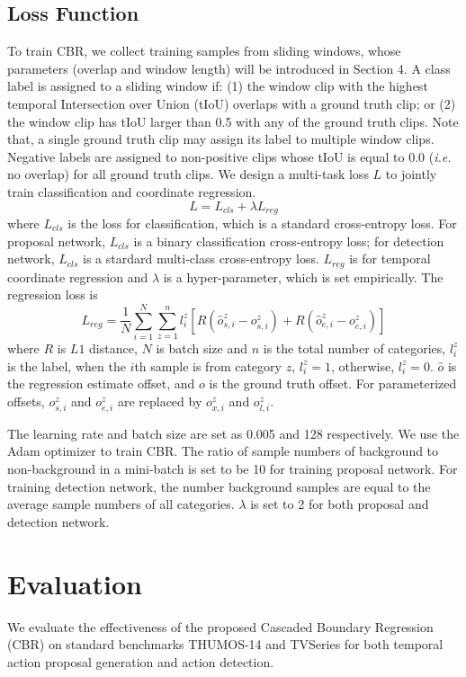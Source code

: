\documentclass{bmvc2k}
\begin{document}
\subsection{Loss Function}
To train CBR, we collect training samples from sliding windows, whose parameters (overlap and window length) will be introduced in Section 4. A class label is assigned to a sliding window if: (1) the window clip with the highest temporal Intersection over Union (tIoU) overlaps with a ground truth clip; or (2) the window clip has tIoU larger than 0.5 with any of the ground truth clips. Note that, a single ground truth clip may assign its label to multiple window clips. Negative labels are assigned to non-positive clips whose tIoU is equal to 0.0 (\emph{i.e.} no overlap) for all ground truth clips. We design a multi-task loss $L$ to jointly train classification and coordinate regression.
\begin{equation}
L=L_{cls}+\lambda L_{reg}
\end{equation}
where $L_{cls}$ is the loss for classification, which is a standard cross-entropy loss. For proposal network, $L_{cls}$ is a binary classification cross-entropy loss; for detection network, $L_{cls}$ is a stardard multi-class cross-entropy loss. $L_{reg}$ is for temporal coordinate regression and $\lambda$ is a hyper-parameter, which is set empirically. The regression loss is 
\begin{equation}
L_{reg}=\frac{1}{N}\sum_{i=1}^{N}\sum_{z=1}^{n} l_i^z[R(\hat{o}^z_{s,i}-o^z_{s,i}) +R(\hat{o}^z_{e,i}-o^z_{e,i})]
\end{equation}
where $R$ is $L1$ distance, $N$ is batch size and $n$ is the total number of categories, $l^z_i$ is the label, when the $i$th sample is from category $z$, $l^z_i=1$, otherwise, $l^z_i=0$. $\hat{o}$ is the regression estimate offset, and $o$ is the ground truth offset. For parameterized offsets, $o^z_{s,i}$ and $o^z_{e,i}$ are replaced by $o^z_{x,i}$ and $o^z_{l,i}$. 

The learning rate and batch size are set as 0.005 and 128 respectively. We use the Adam \cite{kingma2014adam} optimizer to train CBR. The ratio of sample numbers of background to non-background in a mini-batch is set to be 10 for training proposal network. For training detection network, the number background samples are equal to the average sample numbers of all categories. $\lambda$ is set to 2 for both proposal and detection network. 



\section{Evaluation}
We evaluate the effectiveness of the proposed Cascaded Boundary Regression (CBR) on standard benchmarks THUMOS-14 and TVSeries for both temporal action proposal generation and action detection. 
\end{document}
